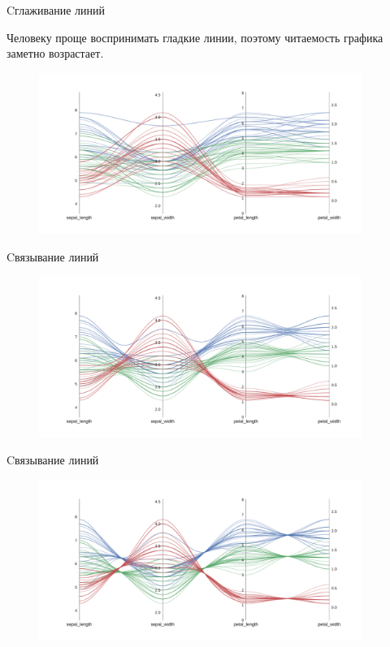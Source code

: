 \documentclass[fleqn, xcolor=x11names]{beamer}
\begin{document}
\begin{frame}{Cглаживание линий}

    \vspace{10px}

    Человеку проще воспринимать гладкие линии, поэтому читаемость графика заметно возрастает.

    \begin{figure}[htb]
        \centering
        \includegraphics[width=10.5cm]{smooth_pc.pdf}
    \end{figure}
\end{frame}

\begin{frame}{Cвязывание линий}
    \begin{figure}[htb]
        \centering
        \includegraphics[width=10.5cm]{bundle_0.3_pc.pdf}
    \end{figure}
\end{frame}

\begin{frame}{Cвязывание линий}  
    \begin{figure}[htb]
        \centering
        \includegraphics[width=10.5cm]{bundle_0.01_pc.pdf}
    \end{figure}
\end{frame}
\end{document}
